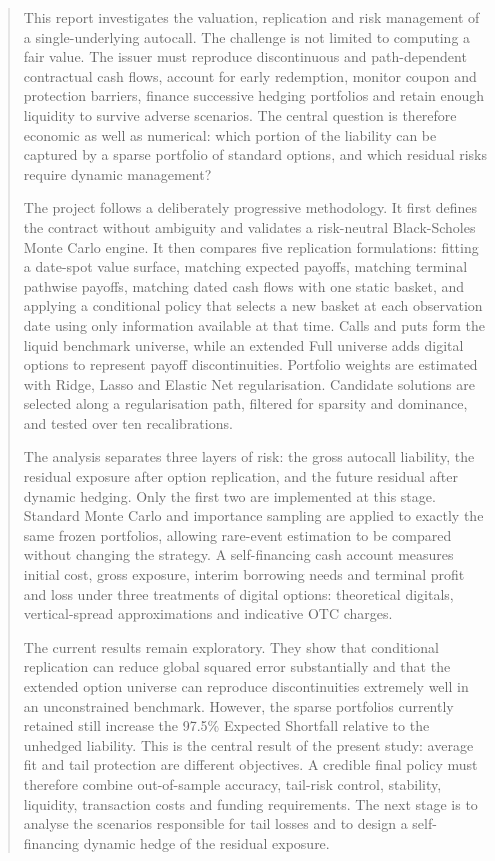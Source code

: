 \documentclass[11pt,a4paper]{article}
\begin{document}
\begin{abstract}
\large
This report investigates the valuation, replication and risk management of a single-underlying autocall. The challenge is not limited to computing a fair value. The issuer must reproduce discontinuous and path-dependent contractual cash flows, account for early redemption, monitor coupon and protection barriers, finance successive hedging portfolios and retain enough liquidity to survive adverse scenarios. The central question is therefore economic as well as numerical: which portion of the liability can be captured by a sparse portfolio of standard options, and which residual risks require dynamic management?

The project follows a deliberately progressive methodology. It first defines the contract without ambiguity and validates a risk-neutral Black-Scholes Monte Carlo engine. It then compares five replication formulations: fitting a date-spot value surface, matching expected payoffs, matching terminal pathwise payoffs, matching dated cash flows with one static basket, and applying a conditional policy that selects a new basket at each observation date using only information available at that time. Calls and puts form the liquid benchmark universe, while an extended Full universe adds digital options to represent payoff discontinuities. Portfolio weights are estimated with Ridge, Lasso and Elastic Net regularisation. Candidate solutions are selected along a regularisation path, filtered for sparsity and dominance, and tested over ten recalibrations.

The analysis separates three layers of risk: the gross autocall liability, the residual exposure after option replication, and the future residual after dynamic hedging. Only the first two are implemented at this stage. Standard Monte Carlo and importance sampling are applied to exactly the same frozen portfolios, allowing rare-event estimation to be compared without changing the strategy. A self-financing cash account measures initial cost, gross exposure, interim borrowing needs and terminal profit and loss under three treatments of digital options: theoretical digitals, vertical-spread approximations and indicative OTC charges.

The current results remain exploratory. They show that conditional replication can reduce global squared error substantially and that the extended option universe can reproduce discontinuities extremely well in an unconstrained benchmark. However, the sparse portfolios currently retained still increase the 97.5\% Expected Shortfall relative to the unhedged liability. This is the central result of the present study: average fit and tail protection are different objectives. A credible final policy must therefore combine out-of-sample accuracy, tail-risk control, stability, liquidity, transaction costs and funding requirements. The next stage is to analyse the scenarios responsible for tail losses and to design a self-financing dynamic hedge of the residual exposure.
\end{abstract}
\end{document}
